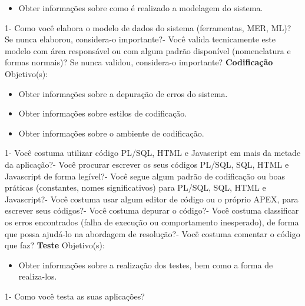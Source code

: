 \begin{anexosenv}
\begin{itemize}
\item Obter informações sobre como é realizado a modelagem do sistema.
\end{itemize}
    1- Como você elabora o modelo de dados do sistema (ferramentas, MER, ML)? Se nunca elaborou, considera-o importante?- Você valida tecnicamente este modelo com área responsável ou com algum padrão disponível (nomenclatura e formas normais)? Se nunca validou, considera-o importante?\newline
\newline
\textbf{Codificação}\newline\newline
Objetivo(s):
\begin{itemize}
\item Obter informações sobre a depuração de erros do sistema.
\item Obter informações sobre estilos de codificação.
\item Obter informações sobre o ambiente de codificação.
\end{itemize}
    1- Você costuma utilizar código PL/SQL, HTML e Javascript em mais da metade da aplicação?- Você procurar escrever os seus códigos PL/SQL, SQL, HTML e Javascript de forma legível?- Você segue algum padrão de codificação ou boas práticas (constantes, nomes significativos) para PL/SQL, SQL, HTML e Javascript?- Você costuma usar algum editor de código ou o próprio APEX, para escrever seus códigos?- Você costuma depurar o código?- Você costuma classificar os erros encontrados (falha de execução ou comportamento inesperado), de forma que possa ajudá-lo na abordagem de resolução?- Você costuma comentar o código que faz?\newline
\newline
\textbf{Teste}\newline\newline
Objetivo(s):
\begin{itemize}
\item Obter informações sobre a realização dos testes, bem como a forma de realiza-los.
\end{itemize}
    1- Como você testa as suas aplicações?\newline

\end{anexosenv}
